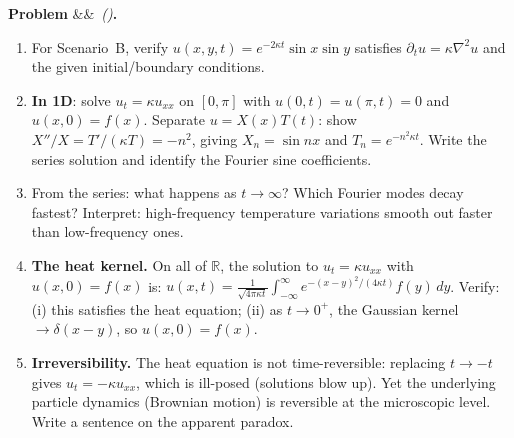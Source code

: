 \documentclass[12pt,a4paper]{article}
\newcounter{problem}
\newenvironment{problem}[1][]{\refstepcounter{problem}\par\vspace{6pt}\noindent\textbf{\color{MidBlue}Problem \theproblem}\ifx&#1&\else\ \textit{(#1)}\fi\textbf{.}\enskip}{\par\vspace{4pt}}
\begin{document}
\begin{problem}
\label{prob:heat}
\begin{enumerate}[label=(\alph*),topsep=2pt]
  \item For Scenario~B, verify $u(x,y,t) = e^{-2\kappa t}\sin x\sin y$ satisfies $\partial_t u = \kappa\nabla^2 u$ and the given initial/boundary conditions.
  \item \textbf{In 1D}: solve $u_t = \kappa u_{xx}$ on $[0,\pi]$ with $u(0,t)=u(\pi,t)=0$ and $u(x,0)=f(x)$. Separate $u=X(x)T(t)$: show $X''/X = T'/(\kappa T) = -n^2$, giving $X_n=\sin nx$ and $T_n=e^{-n^2\kappa t}$. Write the series solution and identify the Fourier sine coefficients.
  \item From the series: what happens as $t\to\infty$? Which Fourier modes decay fastest? Interpret: high-frequency temperature variations smooth out faster than low-frequency ones.
  \item \textbf{The heat kernel.} On all of $\mathbb{R}$, the solution to $u_t=\kappa u_{xx}$ with $u(x,0)=f(x)$ is:
  $u(x,t) = \frac{1}{\sqrt{4\pi\kappa t}}\int_{-\infty}^\infty e^{-(x-y)^2/(4\kappa t)}f(y)\,dy$.
  Verify: (i) this satisfies the heat equation; (ii) as $t\to 0^+$, the Gaussian kernel $\to\delta(x-y)$, so $u(x,0)=f(x)$.
  \item \textbf{Irreversibility.} The heat equation is not time-reversible: replacing $t\to -t$ gives $u_t=-\kappa u_{xx}$, which is ill-posed (solutions blow up). Yet the underlying particle dynamics (Brownian motion) is reversible at the microscopic level. Write a sentence on the apparent paradox.
\end{enumerate}
\end{problem}

\begin{center}
\end{center}
\end{document}
